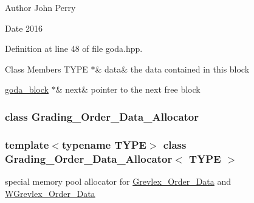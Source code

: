 \begin{DoxyAuthor}{Author}
John Perry 
\end{DoxyAuthor}
\begin{DoxyDate}{Date}
2016 
\end{DoxyDate}


Definition at line 48 of file goda.\+hpp.

\begin{DoxyFields}{Class Members}
\mbox{\label{group__memorygroup_ad5bea3a00bf688f2db31ad5db90e3deb}} 
TYPE $\ast$&
data&
the data contained in this block \\
\hline

\mbox{\label{group__memorygroup_a1f5592b3fed7857bf9336a8e4fba4fdc}} 
\hyperlink{group__memorygroup_uniongoda__block}{goda\_block} $\ast$&
next&
pointer to the next free block \\
\hline

\end{DoxyFields}
\label{class_grading___order___data___allocator}
\subsubsection{class Grading\+\_\+\+Order\+\_\+\+Data\+\_\+\+Allocator}
\subsubsection*{template$<$typename T\+Y\+PE$>$\newline
class Grading\+\_\+\+Order\+\_\+\+Data\+\_\+\+Allocator$<$ T\+Y\+P\+E $>$}

special memory pool allocator for \hyperlink{group__orderinggroup_class_grevlex___order___data}{Grevlex\+\_\+\+Order\+\_\+\+Data} and \hyperlink{group__orderinggroup_class_w_grevlex___order___data}{W\+Grevlex\+\_\+\+Order\+\_\+\+Data} 

